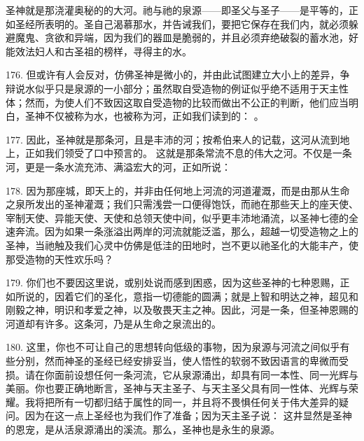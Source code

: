 圣神就是那浇灌奥秘的的大河。祂与祂的泉源——即圣父与圣子——是平等的，正如圣经所表明的。圣自己渴慕那水，并告诫我们，要把它保存在我们内，就必须躲避魔鬼、贪欲和异端，因为我们的器皿是脆弱的，并且必须弃绝破裂的蓄水池，好能效法妇人和古圣祖的榜样，寻得主的水。\par

176. 但或许有人会反对，仿佛圣神是微小的，并由此试图建立大小上的差异，争辩说水似乎只是泉源的一小部分；虽然取自受造物的例证似乎绝不适用于天主性体；然而，为使人们不致因这取自受造物的比较而做出不公正的判断，他们应当明白，圣神不仅被称为水，也被称为河，正如我们读到的： 。\par

177. 因此，圣神就是那条河，且是丰沛的河；按希伯来人的记载，这河从流到地上，正如我们领受了口中预言的。 这就是那条常流不息的伟大之河。不仅是一条河，更是一条水流充沛、满溢宏大的河，正如所说：\par

178. 因为那座城，即天上的，并非由任何地上河流的河道灌溉，而是由那从生命之泉所发出的圣神灌溉；我们只需浅尝一口便得饱饫，而祂在那些天上的座天使、宰制天使、异能天使、天使和总领天使中间，似乎更丰沛地涌流，以圣神七德的全速奔流。因为如果一条涨溢出两岸的河流就能泛滥，那么，超越一切受造物之上的圣神，当祂触及我们心灵中仿佛是低洼的田地时，岂不更以祂圣化的大能丰产，使那受造物的天性欢乐吗？\par

179. 你们也不要因这里说，或别处说而感到困惑，因为这些圣神的七种恩赐，正如所说的，因着它们的圣化，意指一切德能的圆满；就是上智和明达之神，超见和刚毅之神，明识和孝爱之神，以及敬畏天主之神。因此，河是一条，但圣神恩赐的河道却有许多。这条河，乃是从生命之泉流出的。\par

180. 这里，你也不可让自己的思想转向低级的事物，因为泉源与河流之间似乎有些分别，然而神圣的圣经已经安排妥当，使人悟性的软弱不致因语言的卑微而受损。请在你面前设想任何一条河流，它从泉源涌出，却具有同一本性、同一光辉与美丽。你也要正确地断言，圣神与天主圣子、与天主圣父具有同一性体、光辉与荣耀。我将把所有一切都归结于属性的同一，并且将不畏惧任何关于伟大差异的疑问。因为在这一点上圣经也为我们作了准备；因为天主圣子说： 这井显然是圣神的恩宠，是从活泉源涌出的溪流。那么，圣神也是永生的泉源。\par

